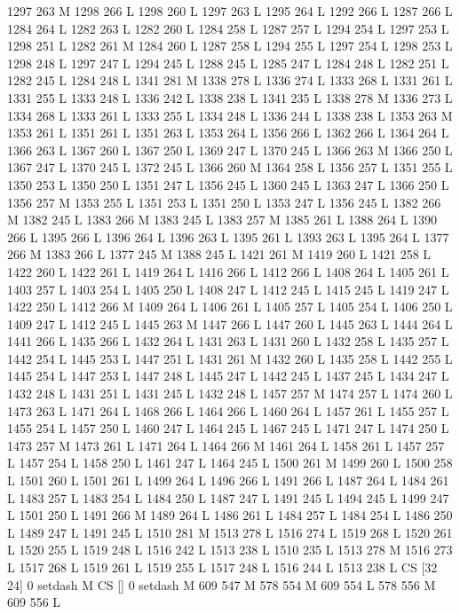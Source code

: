 {{{{{{{{{{{{{{{{{{{{{{{{1297 263 M 1298 266 L
1298 260 L
1297 263 L
1295 264 L
1292 266 L
1287 266 L
1284 264 L
1282 263 L
1282 260 L
1284 258 L
1287 257 L
1294 254 L
1297 253 L
1298 251 L
1282 261 M 1284 260 L
1287 258 L
1294 255 L
1297 254 L
1298 253 L
1298 248 L
1297 247 L
1294 245 L
1288 245 L
1285 247 L
1284 248 L
1282 251 L
1282 245 L
1284 248 L
1341 281 M 1338 278 L
1336 274 L
1333 268 L
1331 261 L
1331 255 L
1333 248 L
1336 242 L
1338 238 L
1341 235 L
1338 278 M 1336 273 L
1334 268 L
1333 261 L
1333 255 L
1334 248 L
1336 244 L
1338 238 L
1353 263 M 1353 261 L
1351 261 L
1351 263 L
1353 264 L
1356 266 L
1362 266 L
1364 264 L
1366 263 L
1367 260 L
1367 250 L
1369 247 L
1370 245 L
1366 263 M 1366 250 L
1367 247 L
1370 245 L
1372 245 L
1366 260 M 1364 258 L
1356 257 L
1351 255 L
1350 253 L
1350 250 L
1351 247 L
1356 245 L
1360 245 L
1363 247 L
1366 250 L
1356 257 M 1353 255 L
1351 253 L
1351 250 L
1353 247 L
1356 245 L
1382 266 M 1382 245 L
1383 266 M 1383 245 L
1383 257 M 1385 261 L
1388 264 L
1390 266 L
1395 266 L
1396 264 L
1396 263 L
1395 261 L
1393 263 L
1395 264 L
1377 266 M 1383 266 L
1377 245 M 1388 245 L
1421 261 M 1419 260 L
1421 258 L
1422 260 L
1422 261 L
1419 264 L
1416 266 L
1412 266 L
1408 264 L
1405 261 L
1403 257 L
1403 254 L
1405 250 L
1408 247 L
1412 245 L
1415 245 L
1419 247 L
1422 250 L
1412 266 M 1409 264 L
1406 261 L
1405 257 L
1405 254 L
1406 250 L
1409 247 L
1412 245 L
1445 263 M 1447 266 L
1447 260 L
1445 263 L
1444 264 L
1441 266 L
1435 266 L
1432 264 L
1431 263 L
1431 260 L
1432 258 L
1435 257 L
1442 254 L
1445 253 L
1447 251 L
1431 261 M 1432 260 L
1435 258 L
1442 255 L
1445 254 L
1447 253 L
1447 248 L
1445 247 L
1442 245 L
1437 245 L
1434 247 L
1432 248 L
1431 251 L
1431 245 L
1432 248 L
1457 257 M 1474 257 L
1474 260 L
1473 263 L
1471 264 L
1468 266 L
1464 266 L
1460 264 L
1457 261 L
1455 257 L
1455 254 L
1457 250 L
1460 247 L
1464 245 L
1467 245 L
1471 247 L
1474 250 L
1473 257 M 1473 261 L
1471 264 L
1464 266 M 1461 264 L
1458 261 L
1457 257 L
1457 254 L
1458 250 L
1461 247 L
1464 245 L
1500 261 M 1499 260 L
1500 258 L
1501 260 L
1501 261 L
1499 264 L
1496 266 L
1491 266 L
1487 264 L
1484 261 L
1483 257 L
1483 254 L
1484 250 L
1487 247 L
1491 245 L
1494 245 L
1499 247 L
1501 250 L
1491 266 M 1489 264 L
1486 261 L
1484 257 L
1484 254 L
1486 250 L
1489 247 L
1491 245 L
1510 281 M 1513 278 L
1516 274 L
1519 268 L
1520 261 L
1520 255 L
1519 248 L
1516 242 L
1513 238 L
1510 235 L
1513 278 M 1516 273 L
1517 268 L
1519 261 L
1519 255 L
1517 248 L
1516 244 L
1513 238 L
CS [32 24] 0 setdash M
CS [] 0 setdash M
609 547 M 578 554 M 609 554 L
578 556 M 609 556 L
}}}}}}}}}}}}}}}}}}}}}}}}
